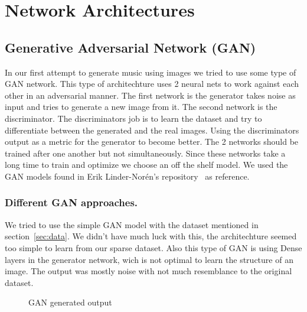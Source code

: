 \documentclass{article}
\begin{document}
\section{Network Architectures}
\label{sec:networksarch}

\subsection{Generative Adversarial Network (GAN)}
\label{sec;gan}

In our first attempt to generate music using images we tried to use some type of GAN network. This type of architechture uses 2 neural nets to work against each other in an adversarial manner. The first network is the generator takes noise as input and tries to generate a new image from it. The second network is the discriminator. The discriminators job is to learn the dataset and try to differentiate between the generated and the real images. Using the discriminators output as a metric for the generator to become better. The 2 networks should be trained after one another but not simultaneously. Since these networks take a long time to train and optimize we choose an off the shelf model. We used the GAN models found in Erik Linder-Norén's repository~\cite{} as reference. 
\subsubsection{Different GAN approaches.}
We tried to use the simple GAN model with the dataset mentioned in section~\ref{sec:data}. We didn't have much luck with this, the architechture seemed too simple to learn from our sparse dataset. Also this type of GAN is using Dense layers in the generator network, wich is not optimal to learn the structure of an image. The output was mostly noise with not much resemblance to the original dataset. 
\begin{figure}[!htb]
	\centering
	\caption{GAN generated output}
	\label{fig:gan}
\end{figure}
\end{document}
